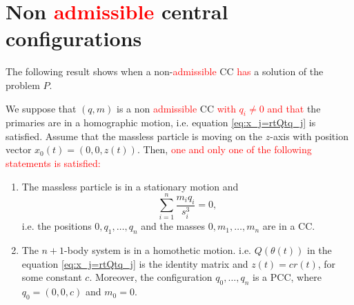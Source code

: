\documentclass[smallcondensed]{svjour3}
\begin{document}
\section{Non \textcolor{red}{admissible} central configurations}

The following result shows when a non-\textcolor{red}{admissible} CC \textcolor{red}{has}  a solution of the problem $P$.

\begin{theorem}\label{thm:no.admisible.movimiento}

We suppose that $(q,m)$ is a non \textcolor{red}{admissible}   CC \textcolor{red}{with $q_i\neq 0$ and that} the primaries are in a homographic motion, i.e.  equation \eqref{eq:x_j=rtQtq_j} is satisfied. Assume that the massless particle is moving on the $z$-axis with position vector $x_0(t)=(0,0,z(t))$. Then, \textcolor{red}{one and only one of the following statements is satisfied:}

\begin{enumerate}
 \item\label{it:z==0} The massless particle is in a stationary motion and
 \begin{equation}\label{eq:acel.centrmasa=0}
  \sum_{i=1}^{n}\frac{m_iq_i}{s_i^3}=0,
 \end{equation}
 i.e. the positions $0,q_1,\ldots,q_n$ and the masses $0,m_1,\ldots,m_n$ are in a CC.
 \item\label{it:z=r} The $n+1$-body system is in a homothetic motion. i.e. $Q(\theta(t))$ in the equation \eqref{eq:x_j=rtQtq_j} is the identity matrix and $z(t)=cr(t)$, for some constant $c$. Moreover, the configuration $q_0,\ldots,q_n$ is a PCC, where $q_0=(0,0,c)$ and $m_0=0$.
\end{enumerate}
\end{theorem}
\end{document}
